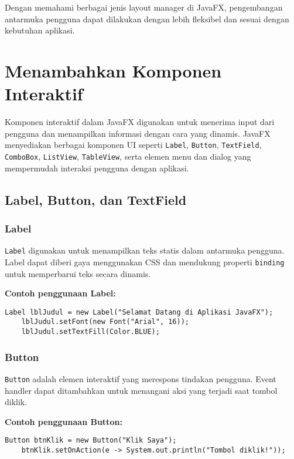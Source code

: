 Dengan memahami berbagai jenis layout manager di JavaFX, pengembangan antarmuka pengguna dapat dilakukan dengan lebih fleksibel dan sesuai dengan kebutuhan aplikasi.


\section{Menambahkan Komponen Interaktif}

Komponen interaktif dalam JavaFX digunakan untuk menerima input dari pengguna dan menampilkan informasi dengan cara yang dinamis. JavaFX menyediakan berbagai komponen UI seperti \texttt{Label}, \texttt{Button}, \texttt{TextField}, \texttt{ComboBox}, \texttt{ListView}, \texttt{TableView}, serta elemen menu dan dialog yang mempermudah interaksi pengguna dengan aplikasi.

\subsection{Label, Button, dan TextField}

\subsubsection{Label}

\texttt{Label} digunakan untuk menampilkan teks statis dalam antarmuka pengguna. Label dapat diberi gaya menggunakan CSS dan mendukung properti \texttt{binding} untuk memperbarui teks secara dinamis.

\textbf{Contoh penggunaan Label:}
\begin{lstlisting}[style=JavaStyle, caption=Membuat Label dalam JavaFX]
	Label lblJudul = new Label("Selamat Datang di Aplikasi JavaFX");
	lblJudul.setFont(new Font("Arial", 16));
	lblJudul.setTextFill(Color.BLUE);
\end{lstlisting}

\subsubsection{Button}

\texttt{Button} adalah elemen interaktif yang merespons tindakan pengguna. Event handler dapat ditambahkan untuk menangani aksi yang terjadi saat tombol diklik.

\textbf{Contoh penggunaan Button:}
\begin{lstlisting}[style=JavaStyle, caption=Membuat Button dan Menangani Event]
	Button btnKlik = new Button("Klik Saya");
	btnKlik.setOnAction(e -> System.out.println("Tombol diklik!"));
\end{lstlisting}

